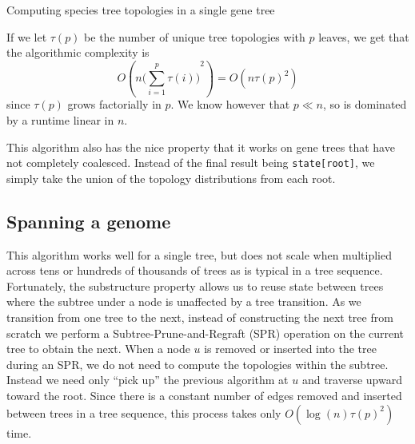 \documentclass{article}
\begin{document}
\begin{algorithm}
    \caption{Computing species tree topologies in a single gene tree}\label{alg:dp_alg}
    \begin{algorithmic}

        \EndFor{}

        \EndFor{}
    \end{algorithmic}
\end{algorithm}
If we let $\tau(p)$ be the number of unique tree topologies with $p$ leaves,
we get that the algorithmic complexity is
\[
    O(n {\big(\sum_{i=1}^p \tau(i)\big)}^2) = O(n {\tau(p)}^2)
\]
since $\tau(p)$ grows factorially in $p$. We know however that $p \ll n$, so is
dominated by a runtime linear in $n$.

This algorithm also has the nice property that it works on gene trees
that have not completely coalesced. Instead of the final result being
\texttt{state[root]}, we simply take the union of the topology distributions
from each root.

\subsection{Spanning a genome}
This algorithm works well for a single tree, but does not scale when multiplied
across tens or hundreds of thousands of trees as is typical in a tree sequence.
Fortunately, the substructure property allows us to reuse state between trees
where the subtree under a node is unaffected by a tree transition.
As we transition from one tree to the next, instead of constructing
the next tree from scratch we perform a Subtree-Prune-and-Regraft (SPR) operation
on the current tree to obtain the next.
When a node $u$ is removed or inserted into the tree during an SPR, we do not
need to compute the topologies within the subtree.
Instead we need only ``pick up'' the previous algorithm at $u$ and traverse
upward toward the root.
Since there is a constant number of edges removed and inserted between trees
in a tree sequence, this process takes only $O(\log(n){\tau(p)}^2)$ time.
\end{document}
